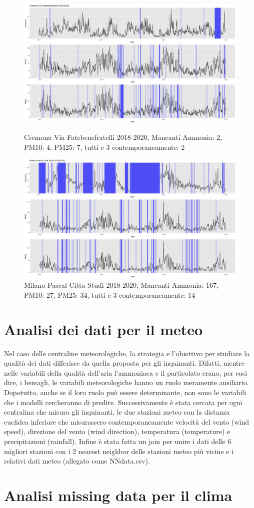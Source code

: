 \documentclass{article}
\begin{document}
\begin{figure}[]
    \centering
    \includegraphics[scale=0.35]{Cremona Via Fatebenefratelli 2018-2020 .jpeg} 
    \caption{Cremona Via Fatebenefratelli 2018-2020, Mancanti Ammonia: 2, PM10: 4, PM25: 7, tutti e 3 contemporaneamente: 2}
    \centering
    \includegraphics[scale=0.35]{Milano Pascal Citta Studi 2018-2020 .jpeg}
    \caption{Milano Pascal Citta Studi 2018-2020, Mancanti Ammonia: 167, PM10: 27, PM25: 34, tutti e 3 contemporaneamente: 14}
\end{figure}

\section{Analisi dei dati per il meteo}
Nel caso delle centraline meteorologiche, la strategia e l’obiettivo per studiare la qualità dei dati differisce da quella proposta per gli inquinanti. 
Difatti, mentre nelle variabili della qualità dell’aria l’ammoniaca e il particolato erano, 
per così dire, i bersagli, le variabili meteorologiche hanno un ruolo meramente ausiliario. 
Dopotutto, anche se il loro ruolo può essere determinante, non sono le variabili che i modelli cercheranno di predire. 
Successivamente è stata cercata per ogni centralina che misura gli inquinanti, le due  
stazioni meteo con la distanza euclidea inferiore che misurassero contemporaneamente velocità del vento (wind speed), 
direzione del vento (wind direction), temperatura (temperature) e precipitazioni (rainfall).
Infine è stata fatta un join per unire i dati delle 6 migliori stazioni con i 2 nearest neighbor delle
stazioni meteo più vicine e i relativi dati meteo (allegato come NNdata.csv). 

\section{Analisi missing data per il clima}
\end{document}

